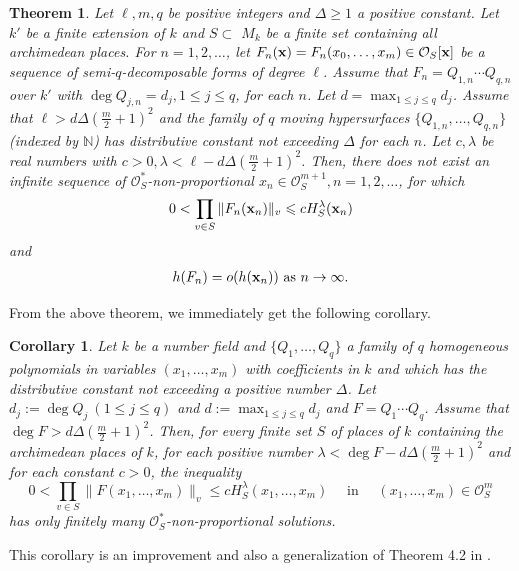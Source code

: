 \documentclass[12pt,leqno]{amsart}
\newtheorem{corollary}[equation]{Corollary}
\newtheorem{theorem}[equation]{Theorem}
\numberwithin{equation}{section}
\begin{document}
\begin{theorem}\label{1.1}
Let $\ell,m,q$ be positive integers and $\Delta\ge 1$ a positive constant. Let $k'$ be a finite extension of $k$ and $S \subset$ $M_{k}$ be a finite set containing all archimedean places. For $n=1,2, \ldots$, let $F_{n}({\bf x})=F_{n}(x_{0}, \ldots, x_{m}) \in \mathcal{O}_{S}[{\bf x}]$ be a sequence of semi-$q$-decomposable forms of degree $\ell$. Assume that $F_n=Q_{1,n} \cdots Q_{q,n}$ over $k'$ with $\deg Q_{j,n}=d_j, 1 \leqslant j \leqslant q$, for each $n$. Let $d=\max _{1 \leqslant j \leqslant q}d_j$. Assume that $\ell>d\Delta\left(\frac{m}{2}+1\right)^2$ and the family of $q$ moving hypersurfaces $\{Q_{1,n}, \ldots ,Q_{q,n}\}$ (indexed by $\mathbb N$) has distributive constant not exceeding $\Delta$ for each $n$. Let $c, \lambda$ be real numbers with $c>0, \lambda<\ell-d\Delta\left(\frac{m}{2}+1\right)^{2}$. Then, there does not exist an infinite sequence of $\mathcal{O}_{S}^{*}$-non-proportional $x_{n} \in \mathcal{O}_{S}^{m+1}, n=1,2, \ldots$, for which
\begin{align}\label{1.2}
0<\prod_{v \in S}\|F_{n}({\bf x}_{n})\|_{v} \leqslant c H_{S}^{\lambda}({\bf x}_{n})
\end{align}
and
\begin{align}\label{1.3}
h(F_{n})=o(h({\bf x}_{n})) \text { as } n\rightarrow \infty.
\end{align}
\end{theorem}

From the above theorem, we immediately get the following corollary.
\begin{corollary}\label{1.4}
Let $k$ be a number field and $\{Q_{1}, \ldots, Q_{q}\}$ a family of $q$ homogeneous polynomials in variables $(x_1,\ldots,x_m)$ with coefficients in $k$ and which has the distributive constant not exceeding a positive number $\Delta$. Let $d_{j}:=\deg Q_{j}\ (1\leqslant j\leqslant q)$ and $d:=\max_{1 \leqslant j \leqslant q} d_{j}$ and $F=Q_{1}\cdots Q_{q}$.  Assume that $\deg F>d\Delta(\frac{m}{2}+1)^2$. Then, for every finite set $S$ of places of $k$ containing the archimedean places of $k$, for each positive number $\lambda<\deg F-d\Delta(\frac{m}{2}+1)^2$ and for each constant $c>0$, the inequality
$$0<\prod_{v \in S}\|F(x_{1}, \ldots, x_{m})\|_{v} \leqslant c H_{S}^{\lambda}(x_{1}, \ldots, x_{m}) \quad \text { in } \quad(x_{1}, \ldots, x_{m}) \in \mathcal{O}_{S}^{m}$$
has only finitely many $\mathcal{O}_{S}^{*}$-non-proportional solutions.
\end{corollary}
This corollary is an improvement and also a generalization of Theorem 4.2 in \cite{CRY}.
 
\end{document}
